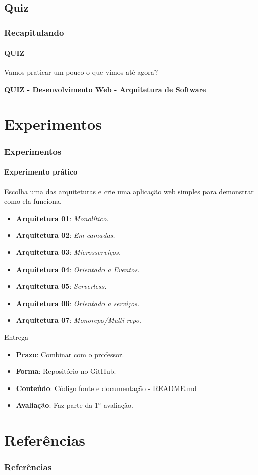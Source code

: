 \documentclass[
	10pt, %
	t, %
]{beamer}
\begin{document}
\subsection{Quiz}

\begin{frame}
	\frametitle{Recapitulando}
	\framesubtitle{QUIZ}

	Vamos praticar um pouco o que vimos até agora?
	\vfill

	\bigskip
	\centering

	\href{https://quizizz.com/admin/quiz/65832b860b273f1989868234?source=quiz_share}{\textbf{QUIZ - Desenvolvimento Web - Arquitetura de Software}}
	\vfill
		
\end{frame}

\section{Experimentos}

\begin{frame}
	\frametitle{Experimentos}
	\framesubtitle{Experimento prático}

	Escolha uma das arquiteturas e crie uma aplicação web simples para demonstrar como ela funciona.

	\smallskip

	\begin{itemize}
		\item \textbf{Arquitetura 01}: \textit{Monolítico.}
		\item \textbf{Arquitetura 02}: \textit{Em camadas.}
		\item \textbf{Arquitetura 03}: \textit{Microsserviços.}
		\item \textbf{Arquitetura 04}: \textit{Orientado a Eventos.}
		\item \textbf{Arquitetura 05}: \textit{Serverless.}
		\item \textbf{Arquitetura 06}: \textit{Orientado a serviços.}
		\item \textbf{Arquitetura 07}: \textit{Monorepo/Multi-repo.}
	\end{itemize}
	\begin{block}{Entrega}
		\begin{itemize}
			\item \textbf{Prazo}: Combinar com o professor.
			\item \textbf{Forma}: Repositório no GitHub. 
			\item \textbf{Conteúdo}: Código fonte e documentação - README.md
			\item \textbf{Avaliação}: Faz parte da 1° avaliação.
		\end{itemize}
	\end{block}


\end{frame}

\section{Referências}

\begin{frame}
	\frametitle{Referências}
	\printbibliography
\end{frame}

\end{document}
